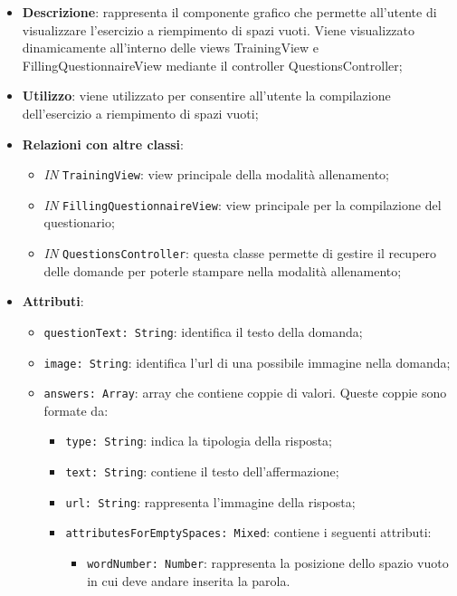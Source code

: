 		\begin{itemize}
			\item \textbf{Descrizione}: rappresenta il componente grafico che permette all'utente di visualizzare l'esercizio a riempimento di spazi vuoti. Viene visualizzato dinamicamente all'interno delle views TrainingView e FillingQuestionnaireView mediante il controller QuestionsController;
			\item \textbf{Utilizzo}: viene utilizzato per consentire all'utente la compilazione dell'esercizio a riempimento di spazi vuoti;
			\item \textbf{Relazioni con altre classi}: 
			\begin{itemize}
				\item \textit{IN} \texttt{TrainingView}: view principale della modalità allenamento; 
				\item \textit{IN} \texttt{FillingQuestionnaireView}: view principale per la compilazione del questionario;
				\item \textit{IN} \texttt{QuestionsController}: questa classe permette di gestire il recupero delle domande per poterle stampare nella modalità allenamento;
			\end{itemize}
			\item \textbf{Attributi}: 
			\begin{itemize}
				\item \texttt{questionText: String}: identifica il testo della domanda;
				\item \texttt{image: String}: identifica l'url di una possibile immagine nella domanda;
				\item \texttt{answers: Array}: array che contiene coppie di valori. Queste coppie sono formate da:
				\begin{itemize}
					\item \texttt{type: String}: indica la tipologia della risposta;
					\item \texttt{text: String}: contiene il testo dell'affermazione;
					\item \texttt{url: String}: rappresenta l'immagine della risposta;
					\item \texttt{attributesForEmptySpaces: Mixed}: contiene i seguenti attributi:
					\begin{itemize}
						\item \texttt{wordNumber: Number}: rappresenta la posizione dello spazio vuoto in cui deve andare inserita la parola.
					\end{itemize}
				\end{itemize}
			\end{itemize}
		\end{itemize}
		
